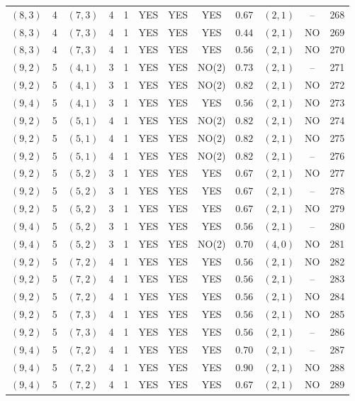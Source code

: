 \begin{longtable}{|c|c|c|c|c|c|c|c|c|c|c|c|}
$(8,3)$ & 4 & $(7,3)$ & 4 & 1 & YES & YES & YES & $0.67$ & $(2,1)$ & -- & 268\\
$(8,3)$ & 4 & $(7,3)$ & 4 & 1 & YES & YES & YES & $0.44$ & $(2,1)$ & NO & 269\\
$(8,3)$ & 4 & $(7,3)$ & 4 & 1 & YES & YES & YES & $0.56$ & $(2,1)$ & NO & 270\\
$(9,2)$ & 5 & $(4,1)$ & 3 & 1 & YES & YES & NO(2) & $0.73$ & $(2,1)$ & -- & 271\\
$(9,2)$ & 5 & $(4,1)$ & 3 & 1 & YES & YES & NO(2) & $0.82$ & $(2,1)$ & NO & 272\\
$(9,4)$ & 5 & $(4,1)$ & 3 & 1 & YES & YES & YES & $0.56$ & $(2,1)$ & NO & 273\\
$(9,2)$ & 5 & $(5,1)$ & 4 & 1 & YES & YES & NO(2) & $0.82$ & $(2,1)$ & NO & 274\\
$(9,2)$ & 5 & $(5,1)$ & 4 & 1 & YES & YES & NO(2) & $0.82$ & $(2,1)$ & NO & 275\\
$(9,2)$ & 5 & $(5,1)$ & 4 & 1 & YES & YES & NO(2) & $0.82$ & $(2,1)$ & -- & 276\\
$(9,2)$ & 5 & $(5,2)$ & 3 & 1 & YES & YES & YES & $0.67$ & $(2,1)$ & NO & 277\\
$(9,2)$ & 5 & $(5,2)$ & 3 & 1 & YES & YES & YES & $0.67$ & $(2,1)$ & -- & 278\\
$(9,2)$ & 5 & $(5,2)$ & 3 & 1 & YES & YES & YES & $0.67$ & $(2,1)$ & NO & 279\\
$(9,4)$ & 5 & $(5,2)$ & 3 & 1 & YES & YES & YES & $0.56$ & $(2,1)$ & -- & 280\\
$(9,4)$ & 5 & $(5,2)$ & 3 & 1 & YES & YES & NO(2) & $0.70$ & $(4,0)$ & NO & 281\\
$(9,2)$ & 5 & $(7,2)$ & 4 & 1 & YES & YES & YES & $0.56$ & $(2,1)$ & NO & 282\\
$(9,2)$ & 5 & $(7,2)$ & 4 & 1 & YES & YES & YES & $0.56$ & $(2,1)$ & -- & 283\\
$(9,2)$ & 5 & $(7,2)$ & 4 & 1 & YES & YES & YES & $0.56$ & $(2,1)$ & NO & 284\\
$(9,2)$ & 5 & $(7,3)$ & 4 & 1 & YES & YES & YES & $0.56$ & $(2,1)$ & NO & 285\\
$(9,2)$ & 5 & $(7,3)$ & 4 & 1 & YES & YES & YES & $0.56$ & $(2,1)$ & -- & 286\\
$(9,4)$ & 5 & $(7,2)$ & 4 & 1 & YES & YES & YES & $0.70$ & $(2,1)$ & -- & 287\\
$(9,4)$ & 5 & $(7,2)$ & 4 & 1 & YES & YES & YES & $0.90$ & $(2,1)$ & NO & 288\\
$(9,4)$ & 5 & $(7,2)$ & 4 & 1 & YES & YES & YES & $0.67$ & $(2,1)$ & NO & 289\\

\end{longtable}
